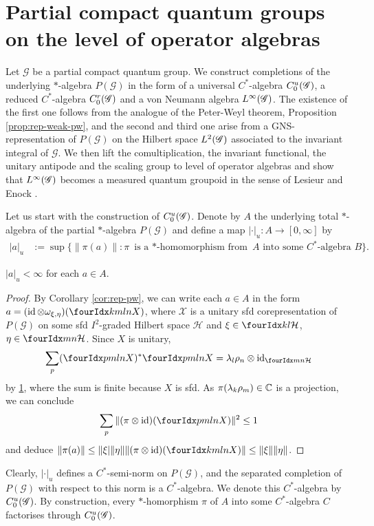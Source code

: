 \section{Partial compact quantum groups on the level of operator algebras}


Let $\mathscr{G}$ be a partial compact quantum group. We construct
completions of the underlying $*$-algebra $P(\mathscr{G})$ in the form
of a universal $C^{*}$-algebra $C^{u}_{0}(\mathscr{G})$, a reduced $C^{*}$-algebra
$C^{r}_{0}(\mathscr{G})$ and a von Neumann algebra $L^{\infty}(\mathscr{G})$. The existence of the first
one follows from the analogue of the Peter-Weyl theorem, Proposition \ref{prop:rep-weak-pw}, and the second and
third one arise from a GNS-representation of $P(\mathscr{G})$ on the
Hilbert space $L^{2}(\mathscr{G})$ associated to the invariant integral of
$\mathscr{G}$.  We then lift the comultiplication, the invariant
functional, the unitary antipode and the scaling group to level of
operator algebras and show that $L^{\infty}(\mathscr{G})$ becomes a measured quantum
groupoid in the sense of Lesieur \cite{Les1} and Enock \cite{Eno2}.

Let us start with the construction of $C^{u}_{0}(\mathscr{G})$. Denote by $A$ the
underlying total $*$-algebra of the partial $*$-algebra
$P(\mathscr{G})$ and define a map $|\cdot |_{u} \colon A \to [0,\infty]$ by
\begin{align*} 
  |a|_{u}&:= \sup \{ \|\pi(a)\| : \pi \text{ is a $*$-homomorphism from } A
  \text{ into some $C^{*}$-algebra } B\}.
\end{align*}
\begin{Lem}
  $|a|_{u}<\infty$ for each $a \in A$. 
\end{Lem}
\begin{proof}
  By Corollary \ref{cor:rep-pw}, we can write each $a\in A$ in the form
  $a=(\id \otimes \omega_{\xi,\eta})(\Gr{X}{k}{l}{m}{n})$, where $\mathscr{X}$ is a unitary
  sfd corepresentation of $P(\mathscr{G})$ on some sfd $I^{2}$-graded
  Hilbert space $\mathcal{H}$ and
  $\xi\in \Gru{\mathcal{H}}{k}{l}$, $\eta\in \Gru{\mathcal{H}}{m}{n}$.
  Since $X$ is unitary,
  \begin{align*}
    \sum_{p}(\Gr{X}{p}{l}{m}{n})^{*} \Gr{X}{p}{l}{m}{n}  = \lambda_{l}\rho_{n}
    \otimes \id_{\Gru{\mathcal{H}}{m}{n}}
  \end{align*}
  by \ref{}, where the sum is finite because $X$ is sfd. As
  $\pi(\lambda_{k}\rho_{m})\in \mathbb{C}$ is a projection, we can conclude
  \begin{align} \label{eq:corep-estimate}
    \sum_{p} \| (\pi \otimes \id)(\Gr{X}{p}{l}{m}{n})\|^{2} \leq 1
  \end{align}
  and deduce $\|\pi(a)\| \leq \| \xi| \|\eta\| \|(\pi \otimes \id)(\Gr{X}{k}{l}{m}{n})\| \leq
    \|\xi\|\|\eta\| $. 
\end{proof}
Clearly, $|\cdot|_{u}$ defines a $C^{*}$-semi-norm on
$P(\mathscr{G})$, and the separated completion of $P(\mathscr{G})$
with respect to this norm is a $C^{*}$-algebra. We denote this
$C^{*}$-algebra by $C^{u}_{0}(\mathscr{G})$. By construction, every $*$-homorphism $\pi$
of $A$ into some $C^{*}$-algebra $C$ factorises through $C^{u}_{0}(\mathscr{G})$. 

